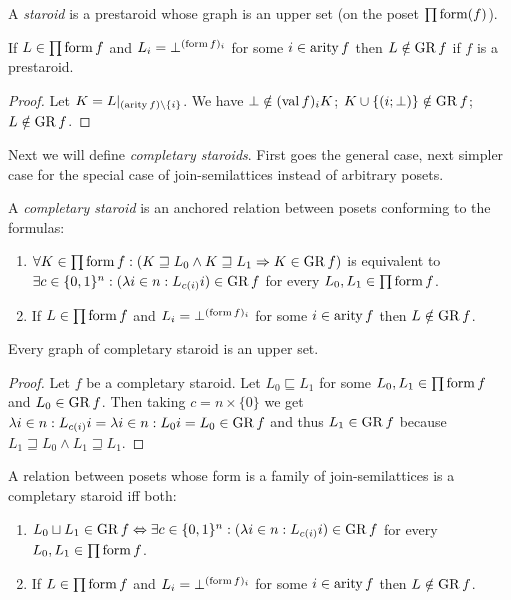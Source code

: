 \begin{defn}
A \emph{staroid} is a prestaroid whose graph is an
upper set (on the poset $\prod\operatorname{form}(f)$).\end{defn}
\begin{prop}
If $L\in\prod\operatorname{form} f$ and $L_{i}=\bot^{(\operatorname{form} f)_{i}}$ for some
$i\in\operatorname{arity} f$ then $L\notin\operatorname{GR} f$ if $f$ is a prestaroid.\end{prop}
\begin{proof}
Let $K=L|_{(\operatorname{arity} f)\setminus\{i\}}$. We have $\bot\notin(\operatorname{val} f)_{i}K$;
$K\cup\{(i;\bot)\}\notin\operatorname{GR} f$; $L\notin\operatorname{GR} f$.
\end{proof}
Next we will define \emph{completary staroids}. First goes the general
case, next simpler case for the special case of join-semilattices
instead of arbitrary posets.
\begin{defn}
A \emph{completary staroid} is an anchored
relation between posets conforming to the formulas:
\begin{enumerate}
\item $\forall K\in\prod\operatorname{form} f:(K\sqsupseteq L_{0}\wedge K\sqsupseteq L_{1}\Rightarrow K\in\operatorname{GR} f)$
is equivalent to $\exists c\in\{0,1\}^{n}:(\lambda i\in n:L_{c(i)}i)\in\operatorname{GR} f$
for every $L_{0},L_{1}\in\prod\operatorname{form} f$.
\item If $L\in\prod\operatorname{form} f$ and $L_{i}=\bot^{(\operatorname{form} f)_{i}}$ for some
$i\in\operatorname{arity} f$ then $L\notin\operatorname{GR} f$.
\end{enumerate}
\end{defn}
\begin{lem}
Every graph of completary staroid is an upper set.\end{lem}
\begin{proof}
Let $f$ be a completary staroid. Let $L_{0}\sqsubseteq L_{1}$ for
some $L_{0},L_{1}\in\prod\operatorname{form} f$ and $L_{0}\in\operatorname{GR} f$. Then taking
$c=n\times\{0\}$ we get $\lambda i\in n:L_{c(i)}i=\lambda i\in n:L_{0}i=L_{0}\in\operatorname{GR} f$
and thus $L_{1}\in\operatorname{GR} f$ because $L_{1}\sqsupseteq L_{0}\wedge L_{1}\sqsupseteq L_{1}$.\end{proof}
\begin{prop}
A relation between posets whose form is
a family of join-semilattices is a completary staroid iff both:
\begin{enumerate}
\item \label{cary-main}$L_{0}\sqcup L_{1}\in\operatorname{GR} f\Leftrightarrow\exists c\in\{0,1\}^{n}:(\lambda i\in n:L_{c(i)}i)\in\operatorname{GR} f$
for every $L_{0},L_{1}\in\prod\operatorname{form} f$.
\item \label{cary-zero}If $L\in\prod\operatorname{form} f$ and $L_{i}=\bot^{(\operatorname{form} f)_{i}}$
for some $i\in\operatorname{arity} f$ then $L\notin\operatorname{GR} f$.
\end{enumerate}
\end{prop}
